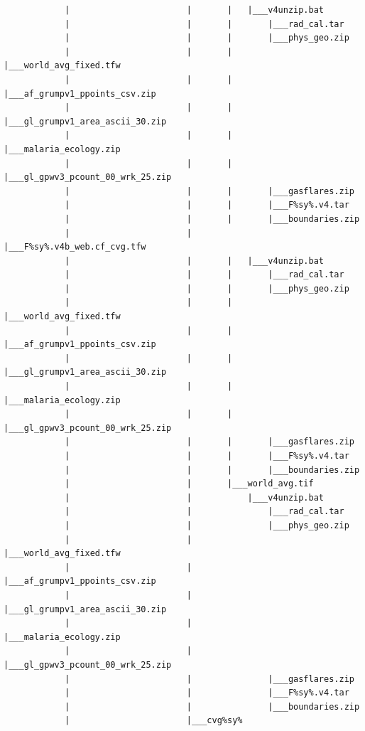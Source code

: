 \documentclass[]{book}
\begin{document}
\begin{verbatim}
            |                       |       |   |___v4unzip.bat
            |                       |       |       |___rad_cal.tar
            |                       |       |       |___phys_geo.zip
            |                       |       |       |___world_avg_fixed.tfw
            |                       |       |       |___af_grumpv1_ppoints_csv.zip
            |                       |       |       |___gl_grumpv1_area_ascii_30.zip
            |                       |       |       |___malaria_ecology.zip
            |                       |       |       |___gl_gpwv3_pcount_00_wrk_25.zip
            |                       |       |       |___gasflares.zip
            |                       |       |       |___F%sy%.v4.tar
            |                       |       |       |___boundaries.zip
            |                       |       |___F%sy%.v4b_web.cf_cvg.tfw
            |                       |       |   |___v4unzip.bat
            |                       |       |       |___rad_cal.tar
            |                       |       |       |___phys_geo.zip
            |                       |       |       |___world_avg_fixed.tfw
            |                       |       |       |___af_grumpv1_ppoints_csv.zip
            |                       |       |       |___gl_grumpv1_area_ascii_30.zip
            |                       |       |       |___malaria_ecology.zip
            |                       |       |       |___gl_gpwv3_pcount_00_wrk_25.zip
            |                       |       |       |___gasflares.zip
            |                       |       |       |___F%sy%.v4.tar
            |                       |       |       |___boundaries.zip
            |                       |       |___world_avg.tif
            |                       |           |___v4unzip.bat
            |                       |               |___rad_cal.tar
            |                       |               |___phys_geo.zip
            |                       |               |___world_avg_fixed.tfw
            |                       |               |___af_grumpv1_ppoints_csv.zip
            |                       |               |___gl_grumpv1_area_ascii_30.zip
            |                       |               |___malaria_ecology.zip
            |                       |               |___gl_gpwv3_pcount_00_wrk_25.zip
            |                       |               |___gasflares.zip
            |                       |               |___F%sy%.v4.tar
            |                       |               |___boundaries.zip
            |                       |___cvg%sy%

\end{verbatim}
\end{document}
